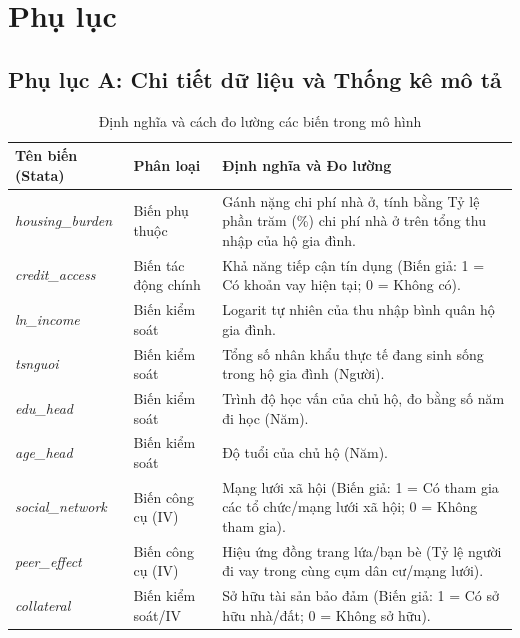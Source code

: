 \documentclass[12pt,a4paper]{report}
\begin{document}
\newpage
\clearpage
\appendix
\chapter*{Phụ lục}
\section*{Phụ lục A: Chi tiết dữ liệu và Thống kê mô tả}

\begin{table}[htbp]
	\centering
	\caption{Định nghĩa và cách đo lường các biến trong mô hình}
	\label{tab:app_var_def}
	\renewcommand{\arraystretch}{1.3} %
	\begin{tabular}{p{3cm} p{3cm} p{8.5cm}}
		\toprule
		\textbf{Tên biến (Stata)} & \textbf{Phân loại} & \textbf{Định nghĩa và Đo lường} \\
		\midrule
		\textit{housing\_burden} & Biến phụ thuộc & Gánh nặng chi phí nhà ở, tính bằng Tỷ lệ phần trăm (\%) chi phí nhà ở trên tổng thu nhập của hộ gia đình. \\
		\textit{credit\_access} & Biến tác động chính & Khả năng tiếp cận tín dụng (Biến giả: 1 = Có khoản vay hiện tại; 0 = Không có). \\
		\textit{ln\_income} & Biến kiểm soát & Logarit tự nhiên của thu nhập bình quân hộ gia đình. \\
		\textit{tsnguoi} & Biến kiểm soát & Tổng số nhân khẩu thực tế đang sinh sống trong hộ gia đình (Người). \\
		\textit{edu\_head} & Biến kiểm soát & Trình độ học vấn của chủ hộ, đo bằng số năm đi học (Năm). \\
		\textit{age\_head} & Biến kiểm soát & Độ tuổi của chủ hộ (Năm). \\
		\textit{social\_network} & Biến công cụ (IV) & Mạng lưới xã hội (Biến giả: 1 = Có tham gia các tổ chức/mạng lưới xã hội; 0 = Không tham gia). \\
		\textit{peer\_effect} & Biến công cụ (IV) & Hiệu ứng đồng trang lứa/bạn bè (Tỷ lệ người đi vay trong cùng cụm dân cư/mạng lưới). \\
		\textit{collateral} & Biến kiểm soát/IV & Sở hữu tài sản bảo đảm (Biến giả: 1 = Có sở hữu nhà/đất; 0 = Không sở hữu). \\
		\bottomrule
	\end{tabular}
\end{table}
\end{document}
